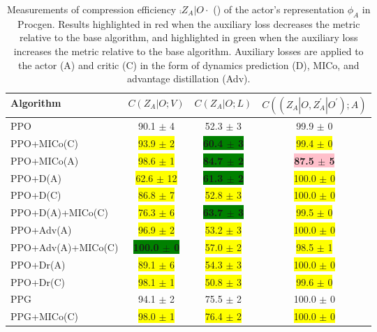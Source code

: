 \begin{table}[!h]
\caption{Measurements of compression efficiency $\comp{Z_A \vert O}{\cdot}$ () of the actor's representation $\phi_A$ in Procgen. Results highlighted in red when the auxiliary loss decreases the metric relative to the base algorithm, and highlighted in green when the auxiliary loss increases the metric relative to the base algorithm. Auxiliary losses are applied to the actor  (A) and critic (C) in the form of dynamics prediction (D), MICo, and advantage distillation (Adv).}
\label{c2:tab:actor-C}
\begin{center}
\begin{tabular}{l|c|c|c}
\textbf{Algorithm} & $C(Z_A \vert O;V)$ & $C(Z_A \vert O;L)$ & $C((Z_A|O,Z^{\prime}_A|O^{\prime});A)$
\\ \hline
PPO & 90.1 $\pm$ 4 & 52.3 $\pm$ 3 & 99.9 $\pm$ 0 \\
PPO+MICo(C) & \colorbox{yellow}{93.9 $\pm$ 2 } & \textbf{\colorbox{green}{60.4 $\pm$ 3 }} & \colorbox{yellow}{99.4 $\pm$ 0 } \\ 
PPO+MICo(A) & \colorbox{yellow}{98.6 $\pm$ 1 } & \textbf{\colorbox{green}{84.7 $\pm$ 2 }} & \textbf{\colorbox{pink}{87.5 $\pm$ 5 }} \\ 
PPO+D(A) & \colorbox{yellow}{62.6 $\pm$ 12 } & \textbf{\colorbox{green}{61.3 $\pm$ 2 }} & \colorbox{yellow}{100.0 $\pm$ 0 } \\ 
PPO+D(C) & \colorbox{yellow}{86.8 $\pm$ 7 } & \colorbox{yellow}{52.8 $\pm$ 3 } & \colorbox{yellow}{100.0 $\pm$ 0 } \\ 
PPO+D(A)+MICo(C) & \colorbox{yellow}{76.3 $\pm$ 6 } & \textbf{\colorbox{green}{63.7 $\pm$ 3 }} & \colorbox{yellow}{99.5 $\pm$ 0 } \\ 
PPO+Adv(A) & \colorbox{yellow}{96.9 $\pm$ 2 } & \colorbox{yellow}{53.2 $\pm$ 3 } & \colorbox{yellow}{100.0 $\pm$ 0 } \\ 
PPO+Adv(A)+MICo(C) & \textbf{\colorbox{green}{100.0 $\pm$ 0 }} & \colorbox{yellow}{57.0 $\pm$ 2 } & \colorbox{yellow}{98.5 $\pm$ 1 } \\ 
PPO+Dr(A) & \colorbox{yellow}{89.1 $\pm$ 6 } & \colorbox{yellow}{54.3 $\pm$ 3 } & \colorbox{yellow}{100.0 $\pm$ 0 } \\ 
PPO+Dr(C) & \colorbox{yellow}{98.1 $\pm$ 1 } & \colorbox{yellow}{50.8 $\pm$ 3 } & \colorbox{yellow}{99.6 $\pm$ 0 } \\ \hline
PPG & 94.1 $\pm$ 2 & 75.5 $\pm$ 2 & 100.0 $\pm$ 0 \\
PPG+MICo(C) & \colorbox{yellow}{98.0 $\pm$ 1 } & \colorbox{yellow}{76.4 $\pm$ 2 } & \colorbox{yellow}{100.0 $\pm$ 0 } \\ 

\end{tabular}
\end{center}
\end{table}
